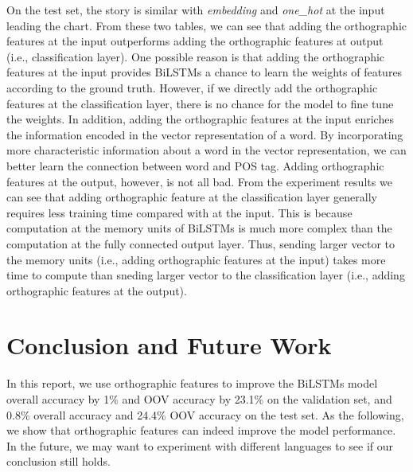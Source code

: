 \documentclass[11pt,letterpaper]{article}
\begin{document}
On the test set, the story is similar with \emph{embedding} and \emph{one\_hot} at the input leading the chart. From these
two tables, we can see that adding the orthographic features at the input outperforms adding
the orthographic features at output (i.e., classification layer). One possible reason is that adding the orthographic features
at the input provides BiLSTMs a chance to learn the weights of features according to the ground truth. However, if we
directly add the orthographic features at the classification layer, there is no chance for the model to fine tune the weights.
In addition, adding the orthographic features at the input enriches the information encoded in the vector representation of a word.
By incorporating more characteristic information about a word in the vector representation, we can better learn the connection
between word and POS tag. Adding orthographic features at the output, however, is not all bad. From the experiment results we can see
that adding orthographic feature at the classification layer generally requires less training time compared with at the input.
This is because computation at the memory units of BiLSTMs is much more complex than the computation at the fully connected output layer.
Thus, sending larger vector to the memory units (i.e., adding orthographic features at the input) takes more time to compute than sneding larger
vector to the classification layer (i.e., adding orthographic features at the output). 


\section{Conclusion and Future Work}
\label{ssec:first}

In this report, we use orthographic features to improve the BiLSTMs model overall
accuracy by 1\% and OOV accuracy by 23.1\% on the validation set, and 0.8\% overall
accuracy and 24.4\% OOV accuracy on the test set. As the following, we show that orthographic
features can indeed improve the model performance. In the future, we may want to experiment
with different languages to see if our conclusion still holds.


\end{document}
